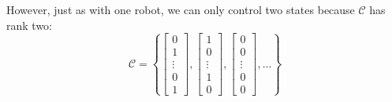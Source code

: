  However, just as with one robot, we can only control two states because $\mathcal{C}$ has rank two:
\begin{equation}
\mathcal{C}=\left\{ \begin{bmatrix} 
0\\
1\\
\vdots\\
0\\
1
\end{bmatrix}
,
  \begin{bmatrix} 
1\\
0\\
\vdots\\
1\\
0
\end{bmatrix}
,
\begin{bmatrix} 
0\\
0\\
\vdots\\
0\\
0
\end{bmatrix}, ... \right\}
\end{equation}  
